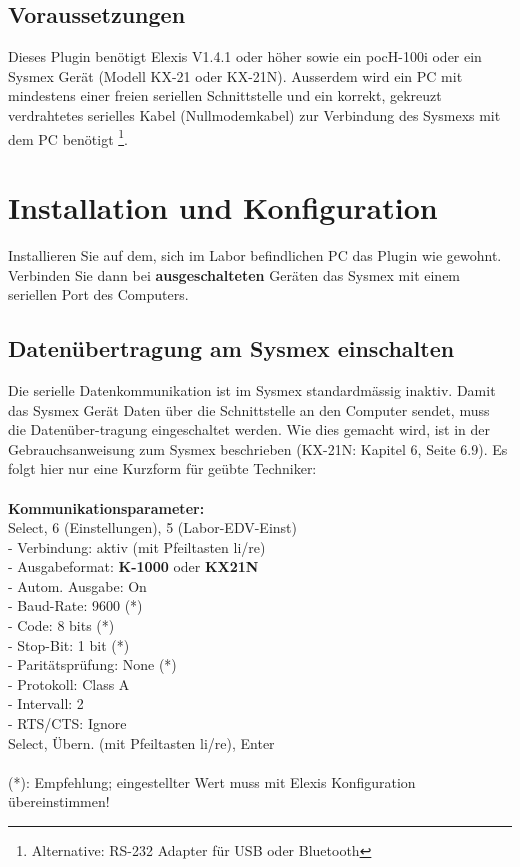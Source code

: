 \documentclass[a4paper]{scrartcl}
\begin{document}
\subsection{Voraussetzungen}
Dieses Plugin ben\"otigt Elexis V1.4.1 oder h\"oher sowie ein pocH-100i oder ein Sysmex Ger\"at (Modell KX-21 oder KX-21N). Ausserdem wird ein PC mit mindestens einer freien seriellen Schnittstelle und ein korrekt, gekreuzt verdrahtetes serielles Kabel (Nullmodemkabel) zur Verbindung des Sysmexs mit dem PC ben\"otigt \footnote{Alternative: RS-232 Adapter f\"ur USB oder Bluetooth}.

\section{Installation und Konfiguration}
Installieren Sie auf dem, sich im Labor befindlichen PC das Plugin wie gewohnt. Verbinden Sie dann bei \textbf{ausgeschalteten} Ger\"aten das Sysmex mit einem seriellen Port des Computers. 
\subsection{Daten\"ubertragung am Sysmex einschalten}
Die serielle Datenkommunikation ist im Sysmex standardm\"assig inaktiv. Damit das Sysmex Ger\"at Daten \"uber die Schnittstelle an den Computer sendet, muss die Daten\"uber-tragung eingeschaltet werden. Wie dies gemacht wird, ist in der Gebrauchsanweisung zum Sysmex beschrieben (KX-21N: Kapitel 6, Seite 6.9). Es folgt hier nur eine Kurzform f\"ur ge\"ubte Techniker:\\
\\
\textbf{Kommunikationsparameter:}\\
Select, 6 (Einstellungen), 5 (Labor-EDV-Einst)\\
 - Verbindung: aktiv (mit Pfeiltasten li/re)\\
 - Ausgabeformat: \textbf{K-1000} oder \textbf{KX21N}\\
 - Autom. Ausgabe: On\\
 - Baud-Rate: 9600 (*)\\
 - Code: 8 bits (*)\\
 - Stop-Bit: 1 bit (*)\\
 - Parit\"atspr\"ufung: None (*)\\
 - Protokoll: Class A\\
 - Intervall: 2\\
 - RTS/CTS: Ignore\\
Select, \"Ubern. (mit Pfeiltasten li/re), Enter\\
\\
(*): Empfehlung; eingestellter Wert muss mit Elexis Konfiguration \"ubereinstimmen!
\end{document}
